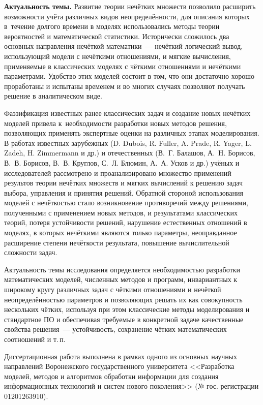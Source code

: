 \textbf{Актуальность темы.} Развитие теории нечётких множеств позволило расширить возможности учёта различных видов неопределённости, для описания которых в~течение долгого времени в моделях использовались методы теории вероятностей и математической статистики. Исторически сложилось два основных направления нечёткой математики~--- нечёткий логический вывод, использующий модели с нечёткими отношениями, и мягкие вычисления, применяемые в классических моделях с чёткими отношениями и нечёткими параметрами. Удобство этих моделей состоит в том, что они достаточно хорошо проработаны и испытаны временем и во многих случаях позволяют получать решение в аналитическом виде.

Фаззификация известных ранее классических задач и создание новых нечётких моделей привела к~необходимости разработки новых методов решения, позволяющих применять экспертные оценки на различных этапах моделирования. В работах известных зарубежных (D. Dubois, R. Fuller, A. Prade, R. Yager, L. Zadeh, H. Zimmermann и др.) и отечественных (В.~Г. Балашов, А.~H. Борисов, В.~В. Борисов, В.~В. Круглов, С.~Л. Блюмин, А.~А. Усков и др.) учёных и исследователей рассмотрено и проанализировано множество применений результов теории нечётких множеств и мягких вычислений к решению задач выбора, управления и принятия решений. Обратной стороной использования моделей с нечёткостью стало возникновение противоречий между решениями, полученными с применением новых методов, и результатами классических теорий, потеря устойчивости решений, нарушение естественных отношений в моделях, в которых нечёткими являются только параметры, неоправданное расширение степени нечёткости результата, повышение вычислительной сложности задач.

Актуальность темы исследования определяется необходимостью разработки математических моделей, численных методов и программ, инвариантных к широкому кругу различных задач с чёткими отношениями и нечёткой неопределённостью параметров и позволяющих решать их как совокупность нескольких чётких, используя при этом классические методы моделирования и стандартное ПО и обеспечивая требуемые в конкретной задаче качественные свойства решения~--- устойчивость, сохранение чётких математических соотношений и т.\,п.

Диссертационная работа выполнена в рамках одного из основных научных направлений Воронежского государственного университета <<Разработка моделей, методов и алгоритмов обработки информации для создания информационных технологий и систем нового поколения>> (№ гос. регистрации 01201263910).

